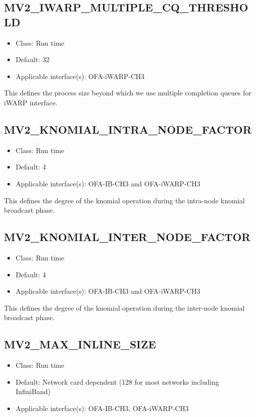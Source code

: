 \subsection{MV2\_IWARP\_MULTIPLE\_CQ\_THRESHOLD}
\label{def:iwarp-multiple-cq-threshold}

\begin{itemize}
    \item Class: Run time

    \item Default: 32
    \item Applicable interface(s): OFA-iWARP-CH3
\end{itemize}

This defines the process size beyond which we use multiple completion queues for
iWARP interface.

\subsection{MV2\_KNOMIAL\_INTRA\_NODE\_FACTOR}
\label{def:mv2_knomial_intra_node_factor}
\begin{itemize}
    \item Class: Run time
    \item Default: 4
    \item Applicable interface(s): OFA-IB-CH3 and OFA-iWARP-CH3
\end{itemize}

This defines the degree of the knomial operation during the intra-node
knomial broadcast phase. 

\subsection{MV2\_KNOMIAL\_INTER\_NODE\_FACTOR}
\label{def:mv2_knomial_inter_node_factor}
\begin{itemize}
    \item Class: Run time
    \item Default: 4
    \item Applicable interface(s): OFA-IB-CH3 and OFA-iWARP-CH3
\end{itemize}

This defines the degree of the knomial operation during the inter-node
knomial broadcast phase. 

\subsection{MV2\_MAX\_INLINE\_SIZE}
\label{def:max-inline-size}
\begin{itemize}
    \item Class: Run time
    \item Default: Network card dependent (128 for most networks including InfiniBand)
    \item Applicable interface(s): OFA-IB-CH3, OFA-iWARP-CH3
\end{itemize}

